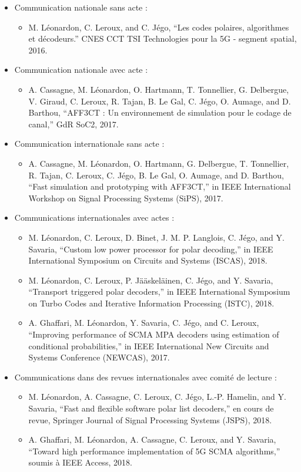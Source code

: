 \begin{itemize}
		\item Communication nationale sans acte :
	\begin{itemize}
		\item M. Léonardon, C. Leroux, and C. Jégo, “Les codes polaires, algorithmes et décodeurs.”
		CNES CCT TSI Technologies pour la 5G - segment spatial, 2016.
	\end{itemize}
	\item Communication nationale avec acte :
	\begin{itemize}
     	\item A. Cassagne, M. Léonardon, O. Hartmann, T. Tonnellier, G. Delbergue, V. Giraud,
			  C. Leroux, R. Tajan, B. Le Gal, C. Jégo, O. Aumage, and D. Barthou, “AFF3CT :
			  Un environnement de simulation pour le codage de canal,” GdR SoC2, 2017.
	\end{itemize}
	\item Communication internationale sans acte :
	\begin{itemize}
		\item  A. Cassagne, M. Léonardon, O. Hartmann, G. Delbergue, T. Tonnellier, R. Tajan,
			   C. Leroux, C. Jégo, B. Le Gal, O. Aumage, and D. Barthou, “Fast simulation and
			   prototyping with AFF3CT,” in IEEE International Workshop on Signal Processing Systems (SiPS), 2017.
	\end{itemize}
	\item Communications internationales avec actes :
	\begin{itemize}
		\item M. Léonardon, C. Leroux, D. Binet, J. M. P. Langlois, C. Jégo, and Y. Savaria,
		“Custom low power processor for polar decoding,” in IEEE International
		Symposium on Circuits and Systems (ISCAS), 2018.
		\item M. Léonardon, C. Leroux, P. Jääskeläinen, C. Jégo, and Y. Savaria, “Transport
		triggered polar decoders,” in IEEE International Symposium on Turbo Codes and
		Iterative Information Processing (ISTC), 2018.
		\item A. Ghaffari, M. Léonardon, Y. Savaria, C. Jégo, and C. Leroux, “Improving performance of SCMA MPA decoders using estimation of conditional probabilities,” in IEEE 
		International New Circuits and Systems Conference (NEWCAS), 2017.
	\end{itemize}
	\item Communications dans des revues internationales avec comité de lecture :
	\begin{itemize}
		\item M. Léonardon, A. Cassagne, C. Leroux, C. Jégo, L.-P. Hamelin, and Y. Savaria, “Fast
        and flexible software polar list decoders,” en cours de revue, Springer Journal of Signal Processing Systems
        (JSPS), 2018.
        \item A. Ghaffari, M. Léonardon, A. Cassagne, C. Leroux, and Y. Savaria, “Toward high
        performance implementation of 5G SCMA algorithms,” soumis à IEEE Access, 2018.
	\end{itemize}
\end{itemize}


